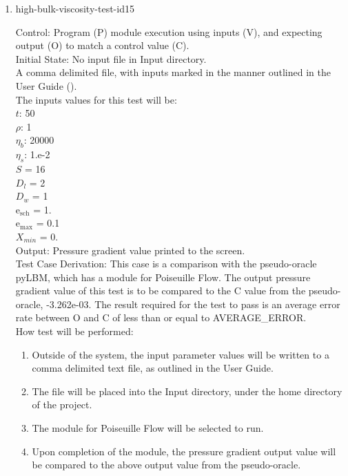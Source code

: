 \documentclass[12pt, titlepage]{article}
\begin{document}
\begin{enumerate}
\item{high-bulk-viscosity-test-id15\\}

Control: Program (P) module execution using inputs (V), and expecting output (O) to match a control value (C).\\
					
Initial State: No input file in Input directory.\\
					
A comma delimited file, with inputs marked in the manner outlined in the User Guide (\citet{LBM_UserGuide_PM}).\\The inputs values for this test will be:\\
$t$: 50\\
$\rho$: 1\\
$\eta_b$: 20000\\
$\eta_s$: 1.e-2\\
$S$ = 16\\
$D_{l}$ = 2\\
$D_{w}$ = 1\\
$\mathrm{e_{sch}}$ = 1.\\
$\mathrm{e_{max}}$ = 0.1\\
$X_{min}$ = 0.\\

					
Output: Pressure gradient value printed to the screen.  \\

Test Case Derivation: This case is a comparison with the pseudo-oracle pyLBM, which has a module for Poiseuille Flow. The output pressure gradient value of this test is to be compared to the C value from the pseudo-oracle, -3.262e-03. The result required for the test to pass is an average error rate between O and C of less than or equal to AVERAGE\_ERROR.\\

					
How test will be performed: 

\begin{enumerate}
\item Outside of the system, the input parameter values will be written to a comma delimited text file, as outlined in the User Guide.
\item The file will be placed into the Input directory, under the home directory of the project.
\item The module for Poiseuille Flow will be selected to run.
\item Upon completion of the module, the pressure gradient output value will be compared to the above output value from the pseudo-oracle.
\end{enumerate}	


\end{enumerate}
\end{document}

